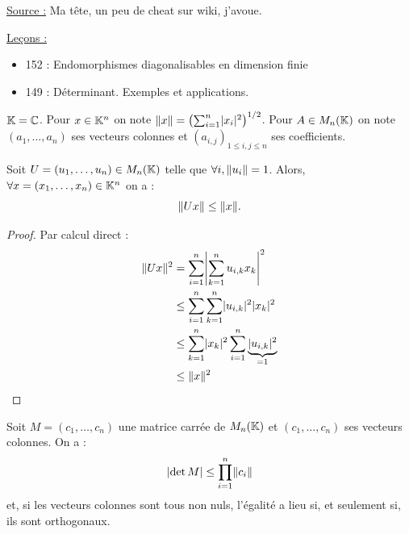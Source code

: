 
\DeclareMathOperator{\Sp}{\text{Sp}}
\newcommand{\trans}[1]{\prescript{t}{}{#1}}

\pagestyle{fancy}

\fancyhead[C]{}
\fancyhead[R]{}



\underline{Source :} Ma tête, un peu de cheat sur wiki, j'avoue.

\underline{Leçons :}
\begin{itemize}
\item 152 : Endomorphismes diagonalisables en dimension finie
\item 149 : Déterminant. Exemples et applications. 
\end{itemize}

\begin{nota}
$\mathbb{K} = \mathbb{C}$. 
Pour $x \in \mathbb{K}^n$ on note $\lVert x\rVert = \left ( \sum_{i=1}^n \lvert x_i\rvert^2 \right )^{1/2}$.
Pour $A \in M_{n}(\mathbb{K})$ on note $(a_1, \dots, a_n)$ ses vecteurs colonnes et $(a_{i,j})_{1\leq i,j \leq n}$ ses coefficients.
\end{nota}

\begin{lem}
Soit $U=(u_1, \dots, u_n) \in M_{n}(\mathbb{K})$ telle que $\forall i, \lVert u_i\rVert = 1$.
Alors, $\forall x=(x_1, \dots, x_n) \in \mathbb{K}^n$ on a :
\[ \lVert Ux\rVert \leq \lVert x\rVert . \]
\end{lem}

\begin{proof}
Par calcul direct :
\begin{align*}
\norm{Ux}^2 & = \sum_{i=1}^n \abs*{\sum_{k=1}^n u_{i,k} x_k}^2 \\
& \leq \sum_{i=1}^n \sum_{k=1}^n \abs{u_{i,k}}^2 \abs{x_k}^2 \\
& \leq \sum_{k=1}^n \abs{x_k}^2 \sum_{i=1}^n \underbrace{\abs{u_{i,k}}^2}_{=1} \\
& \leq \norm{x}^2
\end{align*}
\end{proof}

\begin{thm}
Soit $M=(c_1, \dots, c_n)$ une matrice carrée de $M_{n}(\mathbb{K})$ et $(c_1, \dots, c_n)$ ses vecteurs colonnes. On a :
\[ \lvert\det{M}\rvert \leq \prod_{i=1}^n \lVert c_i\rVert \]
et, si les vecteurs colonnes sont tous non nuls, l'égalité a lieu si, et seulement si, ils sont orthogonaux.
\end{thm}

